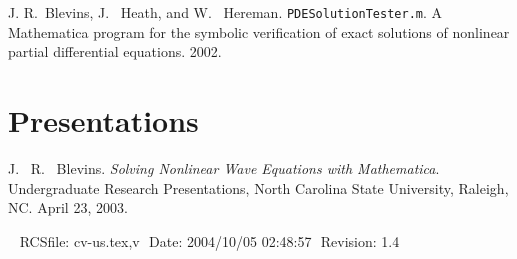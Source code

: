 \documentclass[margin,line,11pt,final]{res}
\begin{document}
\begin{resume}
J. R.\ Blevins, J. \ Heath, and W. \ Hereman.
  \texttt{PDESolutionTester.m}.  A Mathematica program for the symbolic
  verification of exact solutions of nonlinear partial differential
  equations. 2002.

\section{\sc Presentations}


J. \ R. \ Blevins. {\em Solving Nonlinear Wave Equations with
Mathematica}. Undergraduate Research Presentations, North Carolina
State University, Raleigh, NC. April 23, 2003.

\vspace{\fill}\ \newline
{\tiny \rm $ $RCSfile: cv-us.tex,v $ $ }
{\tiny \rm $ $Date: 2004/10/05 02:48:57 $ $ }
{\tiny \rm $ $Revision: 1.4 $ $ }


\end{resume}
\end{document}
